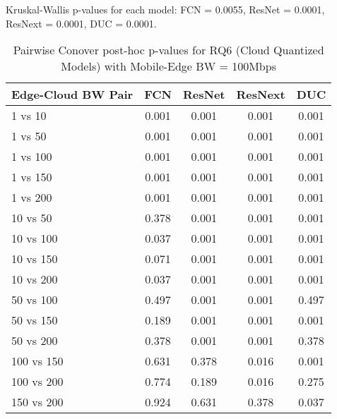 \begin{table}[h]
\centering
\caption{Pairwise Conover post-hoc p-values for RQ6 (Cloud Quantized Models) with Mobile-Edge BW = 100Mbps}
\label{tab:conover_cloud_quantized_me100}
\smallskip
Kruskal-Wallis p-values for each model: FCN = 0.0055, ResNet = 0.0001, ResNext = 0.0001, DUC = 0.0001.

\begin{tabular}{lcccc}
\toprule
Edge-Cloud BW Pair & FCN & ResNet & ResNext & DUC \\
\midrule
1 vs 10 & 0.001 & 0.001 & 0.001 & 0.001 \\
1 vs 50 & 0.001 & 0.001 & 0.001 & 0.001 \\
1 vs 100 & 0.001 & 0.001 & 0.001 & 0.001 \\
1 vs 150 & 0.001 & 0.001 & 0.001 & 0.001 \\
1 vs 200 & 0.001 & 0.001 & 0.001 & 0.001 \\
10 vs 50 & 0.378 & 0.001 & 0.001 & 0.001 \\
10 vs 100 & 0.037 & 0.001 & 0.001 & 0.001 \\
10 vs 150 & 0.071 & 0.001 & 0.001 & 0.001 \\
10 vs 200 & 0.037 & 0.001 & 0.001 & 0.001 \\
50 vs 100 & 0.497 & 0.001 & 0.001 & 0.497 \\
50 vs 150 & 0.189 & 0.001 & 0.001 & 0.001 \\
50 vs 200 & 0.378 & 0.001 & 0.001 & 0.378 \\
100 vs 150 & 0.631 & 0.378 & 0.016 & 0.001 \\
100 vs 200 & 0.774 & 0.189 & 0.016 & 0.275 \\
150 vs 200 & 0.924 & 0.631 & 0.378 & 0.037 \\
\bottomrule
\end{tabular}
\end{table}

